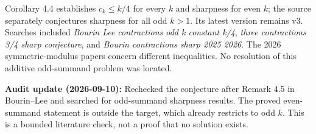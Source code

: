 \documentclass[11pt,a4paper]{article}
\begin{document}
Corollary 4.4 establishes \(c_k\le k/4\) for every \(k\) and sharpness
for even \(k\); the source separately conjectures sharpness for all odd
\(k>1\). Its latest version remains v3. Searches included
\textit{Bourin Lee contractions odd k constant k/4},
\textit{three contractions 3/4 sharp conjecture}, and
\textit{Bourin contractions sharp 2025 2026}. The 2026
symmetric-modulus papers concern different inequalities. No resolution
of this additive odd-summand problem was located.

\textbf{Audit update (2026-09-10):} Rechecked the conjecture after
Remark 4.5 in Bourin--Lee and searched for odd-summand sharpness
results. The proved even-summand statement is outside the target, which
already restricts to odd \(k\). This is a bounded literature check, not
a proof that no solution exists.
\end{document}
